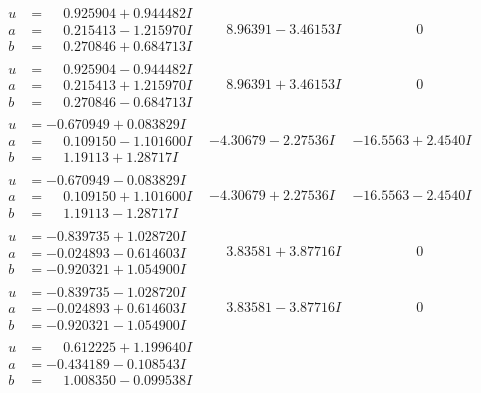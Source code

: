 \documentclass[1p]{elsarticle_modified}
\theoremstyle{definition}
\begin{document}
$$\begin{array}{c|c|c}
\begin{aligned}
u &= \phantom{-}0.925904 + 0.944482 I \\
a &= \phantom{-}0.215413 - 1.215970 I \\
b &= \phantom{-}0.270846 + 0.684713 I\end{aligned}
 & \phantom{-}8.96391 - 3.46153 I & \phantom{-0.000000 } 0 \\ \hline\begin{aligned}
u &= \phantom{-}0.925904 - 0.944482 I \\
a &= \phantom{-}0.215413 + 1.215970 I \\
b &= \phantom{-}0.270846 - 0.684713 I\end{aligned}
 & \phantom{-}8.96391 + 3.46153 I & \phantom{-0.000000 } 0 \\ \hline\begin{aligned}
u &= -0.670949 + 0.083829 I \\
a &= \phantom{-}0.109150 - 1.101600 I \\
b &= \phantom{-}1.19113 + 1.28717 I\end{aligned}
 & -4.30679 - 2.27536 I & -16.5563 + 2.4540 I \\ \hline\begin{aligned}
u &= -0.670949 - 0.083829 I \\
a &= \phantom{-}0.109150 + 1.101600 I \\
b &= \phantom{-}1.19113 - 1.28717 I\end{aligned}
 & -4.30679 + 2.27536 I & -16.5563 - 2.4540 I \\ \hline\begin{aligned}
u &= -0.839735 + 1.028720 I \\
a &= -0.024893 - 0.614603 I \\
b &= -0.920321 + 1.054900 I\end{aligned}
 & \phantom{-}3.83581 + 3.87716 I & \phantom{-0.000000 } 0 \\ \hline\begin{aligned}
u &= -0.839735 - 1.028720 I \\
a &= -0.024893 + 0.614603 I \\
b &= -0.920321 - 1.054900 I\end{aligned}
 & \phantom{-}3.83581 - 3.87716 I & \phantom{-0.000000 } 0 \\ \hline\begin{aligned}
u &= \phantom{-}0.612225 + 1.199640 I \\
a &= -0.434189 - 0.108543 I \\
b &= \phantom{-}1.008350 - 0.099538 I\end{aligned}

\end{array}$$
\end{document}

